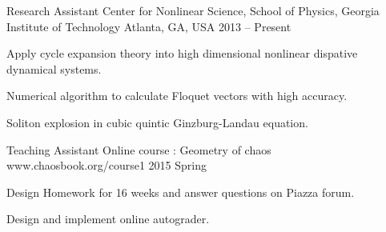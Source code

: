 


\begin{cventries}


\cventry
{Research Assistant}
{Center for Nonlinear Science, School of Physics,
  Georgia Institute of Technology}
{Atlanta, GA, USA}
{2013 -- Present}
{
  \begin{cvitems}
  \item {Apply cycle expansion theory into high dimensional nonlinear dispative dynamical systems.}
  \item {Numerical algorithm to calculate Floquet vectors with high accuracy.}
  \item {Soliton explosion in cubic quintic Ginzburg-Landau equation.} 
  \end{cvitems}
}




\cventry 
{Teaching Assistant}
{Online course : Geometry of chaos}
{www.chaosbook.org/course1}
{2015 Spring}
{
  \begin{cvitems}
    \item {Design Homework for 16 weeks and answer questions on
        Piazza forum.}
    \item {Design and implement online autograder.}
  \end{cvitems}
}


\end{cventries}
